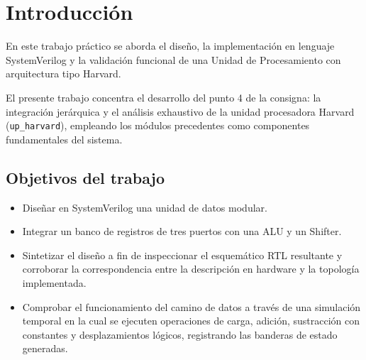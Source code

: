 \chapter{Introducción}

En este trabajo práctico se aborda el diseño, la implementación en lenguaje SystemVerilog y la validación
funcional de una Unidad de Procesamiento con arquitectura tipo Harvard.

El presente trabajo concentra el desarrollo del punto 4 de la consigna: la integración jerárquica y el análisis
exhaustivo de la unidad procesadora Harvard (\texttt{up\_harvard}), empleando los módulos precedentes como componentes
fundamentales del sistema.

\section{Objetivos del trabajo}

\begin{itemize}
  \item Diseñar en SystemVerilog una unidad de datos modular.
  \item Integrar un banco de registros de tres puertos con una ALU y un Shifter. 
  \item Sintetizar el diseño a fin de inspeccionar el esquemático RTL resultante y corroborar la correspondencia entre
    la descripción en hardware y la topología implementada.
  \item Comprobar el funcionamiento del camino de datos a través de una simulación temporal en la cual se ejecuten
    operaciones de carga, adición, sustracción con constantes y desplazamientos lógicos, registrando las banderas de
    estado generadas.
\end{itemize}


